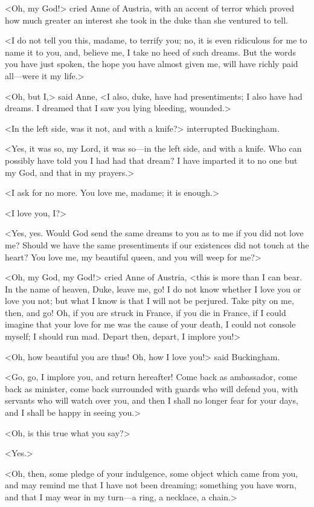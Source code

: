 <Oh, my God!> cried Anne of Austria, with an accent of terror which proved how much greater an interest she took in the duke than she ventured to tell. 

<I do not tell you this, madame, to terrify you; no, it is even ridiculous for me to name it to you, and, believe me, I take no heed of such dreams. But the words you have just spoken, the hope you have almost given me, will have richly paid all---were it my life.> 

<Oh, but I,> said Anne, <I also, duke, have had presentiments; I also have had dreams. I dreamed that I saw you lying bleeding, wounded.> 

<In the left side, was it not, and with a knife?> interrupted Buckingham. 

<Yes, it was so, my Lord, it was so---in the left side, and with a knife. Who can possibly have told you I had had that dream? I have imparted it to no one but my God, and that in my prayers.> 

<I ask for no more. You love me, madame; it is enough.> 

<I love you, I?> 

<Yes, yes. Would God send the same dreams to you as to me if you did not love me? Should we have the same presentiments if our existences did not touch at the heart? You love me, my beautiful queen, and you will weep for me?> 

<Oh, my God, my God!> cried Anne of Austria, <this is more than I can bear. In the name of heaven, Duke, leave me, go! I do not know whether I love you or love you not; but what I know is that I will not be perjured. Take pity on me, then, and go! Oh, if you are struck in France, if you die in France, if I could imagine that your love for me was the cause of your death, I could not console myself; I should run mad. Depart then, depart, I implore you!> 

<Oh, how beautiful you are thus! Oh, how I love you!> said Buckingham. 

<Go, go, I implore you, and return hereafter! Come back as ambassador, come back as minister, come back surrounded with guards who will defend you, with servants who will watch over you, and then I shall no longer fear for your days, and I shall be happy in seeing you.> 

<Oh, is this true what you say?> 

<Yes.> 

<Oh, then, some pledge of your indulgence, some object which came from you, and may remind me that I have not been dreaming; something you have worn, and that I may wear in my turn---a ring, a necklace, a chain.> 

